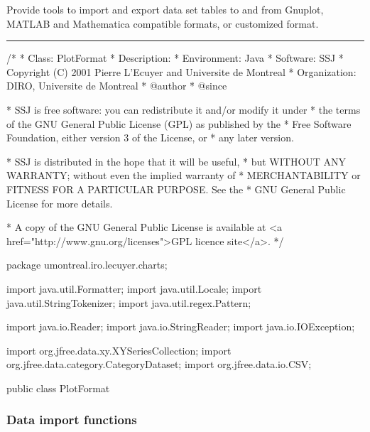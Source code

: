 
Provide tools to import and export data set tables
to and from Gnuplot, MATLAB and Mathematica compatible
formats, or customized format.

\bigskip\hrule
\begin{code}
\begin{hide}
/*
 * Class:        PlotFormat
 * Description:  
 * Environment:  Java
 * Software:     SSJ 
 * Copyright (C) 2001  Pierre L'Ecuyer and Universite de Montreal
 * Organization: DIRO, Universite de Montreal
 * @author       
 * @since

 * SSJ is free software: you can redistribute it and/or modify it under
 * the terms of the GNU General Public License (GPL) as published by the
 * Free Software Foundation, either version 3 of the License, or
 * any later version.

 * SSJ is distributed in the hope that it will be useful,
 * but WITHOUT ANY WARRANTY; without even the implied warranty of
 * MERCHANTABILITY or FITNESS FOR A PARTICULAR PURPOSE.  See the
 * GNU General Public License for more details.

 * A copy of the GNU General Public License is available at
   <a href="http://www.gnu.org/licenses">GPL licence site</a>.
 */
\end{hide}
package umontreal.iro.lecuyer.charts;\begin{hide}

import   java.util.Formatter;
import   java.util.Locale;
import   java.util.StringTokenizer;
import   java.util.regex.Pattern;

import   java.io.Reader;
import   java.io.StringReader;
import   java.io.IOException;

import   org.jfree.data.xy.XYSeriesCollection;
import   org.jfree.data.category.CategoryDataset;
import   org.jfree.data.io.CSV;\end{hide}

public class PlotFormat\begin{hide} {
   private PlotFormat() {}\end{hide}
\end{code}

\subsubsection*{Data import functions}

